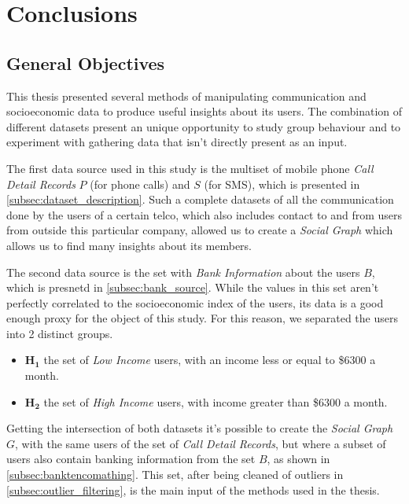 \chapter{Conclusions}

\section{General Objectives}

This thesis presented several methods of manipulating communication and socioeconomic data to produce useful insights about its users.
The combination of different datasets present an unique opportunity to study group behaviour and to experiment with gathering data that isn't directly present as an input.

The first data source used in this study is the multiset of mobile phone \emph{Call Detail Records} $P$ (for phone calls) and $S$ (for SMS), which is presented in \cref{subsec:dataset_description}.
Such a complete datasets of all the communication done by the users of a certain telco, which also includes contact to and from users from outside this particular company, allowed us to create a \emph{Social Graph} which allows us to find many insights about its members.

The second data source is the set with \emph{Bank Information} about the users $B$, which is presnetd in \cref{subsec:bank_source}.
While the values in this set aren't perfectly correlated to the socioeconomic index of the users, its data is a good enough proxy for the object of this study.
For this reason, we separated the users into 2 distinct groups\footnotemark{}.


\begin{itemize}
	\item $\mathbf{H_1}$ the set of \emph{Low Income} users, with an income less or equal to \$6300 a month.
	\item $\mathbf{H_2}$ the set of \emph{High Income} users, with income greater than \$6300 a month.
\end{itemize}

Getting the intersection of both datasets it's possible to create the \emph{Social Graph} $G$, with the same users of the set of \emph{Call Detail Records}, but where a subset of users also contain banking information from the set $B$, as shown in \cref{subsec:banktencomathing}.
This set, after being cleaned of outliers in \cref{subsec:outlier_filtering}, is the main input of the methods used in the thesis.

